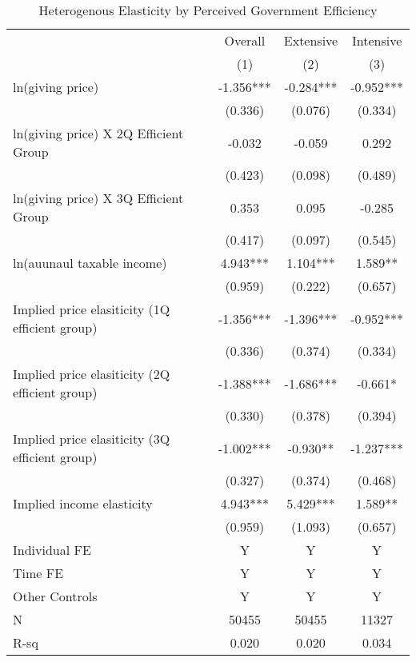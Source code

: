 \documentclass[ review  , 3p ]{elsarticle}
\begin{document}
  \begin{table}

  \caption{\label{tab:kableHeteroElasticity}Heterogenous Elasticity by Perceived Government Efficiency}
  \centering
  \fontsize{8}{10}\selectfont
  \begin{threeparttable}
  \begin{tabular}[t]{lccc}
  \toprule
  \multicolumn{1}{c}{ } & \multicolumn{1}{c}{Overall} & \multicolumn{1}{c}{Extensive} & \multicolumn{1}{c}{Intensive} \\
  \cmidrule(l{3pt}r{3pt}){2-2} \cmidrule(l{3pt}r{3pt}){3-3} \cmidrule(l{3pt}r{3pt}){4-4}
   & (1) & (2) & (3)\\
  \midrule
  ln(giving price) & -1.356*** & -0.284*** & -0.952***\\
   & (0.336) & (0.076) & (0.334)\\
  ln(giving price) X 2Q Efficient Group & -0.032 & -0.059 & 0.292\\
   & (0.423) & (0.098) & (0.489)\\
  ln(giving price) X 3Q Efficient Group & 0.353 & 0.095 & -0.285\\
   & (0.417) & (0.097) & (0.545)\\
  ln(auunaul taxable income) & 4.943*** & 1.104*** & 1.589**\\
   & (0.959) & (0.222) & (0.657)\\
  Implied price elasiticity (1Q efficient group) & -1.356*** & -1.396*** & -0.952***\\
   & (0.336) & (0.374) & (0.334)\\
  Implied price elasiticity (2Q efficient group) & -1.388*** & -1.686*** & -0.661*\\
   & (0.330) & (0.378) & (0.394)\\
  Implied price elasiticity (3Q efficient group) & -1.002*** & -0.930** & -1.237***\\
   & (0.327) & (0.374) & (0.468)\\
  Implied income elasticity & 4.943*** & 5.429*** & 1.589**\\
   & (0.959) & (1.093) & (0.657)\\
  Individual FE & Y & Y & Y\\
  Time FE & Y & Y & Y\\
  Other Controls & Y & Y & Y\\
  N & 50455 & 50455 & 11327\\
  R-sq & 0.020 & 0.020 & 0.034\\
  \bottomrule
  \end{tabular}

\end{threeparttable}
\end{table}
\end{document}
